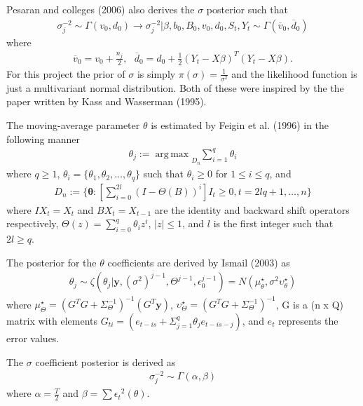 \documentclass[submit]{smj}
\DeclareMathOperator*{\argmax}{arg\,max}
\begin{document}
Pesaran and colleges (2006) also derives the $\sigma$ posterior such that 
\begin{align*}
\sigma_j^{-2} \sim  \Gamma(v_0, d_0) \longrightarrow \sigma^{-2}_j | \beta, b_0, B_0, v_0, d_0 , S_{t}, Y_{t} \sim \Gamma ( \overline{v}_0,  \overline{d}_0)
\end{align*}
where 
\begin{align*}
\overline{v}_0 = v_0 + \frac{n_j}{2} , \ \ \  \overline{d}_0 = d_0 + \frac{1}{2}(Y_t-X\beta)^T(Y_t- X \beta).
\end{align*}
For this project the prior of $\sigma$ is simply $\pi(\sigma) = \frac{1}{\sigma^2}$ and the likelihood function is just a multivariant normal distribution. Both of these were inspired by the the paper written by Kass and Wasserman (1995). 

The moving-average parameter $\theta$ is estimated by Feigin et al. (1996) in the following manner
\begin{align*}
    \theta_j := \argmax\underset{D_n}{}\sum_{i=1}^{q} \theta_i
\end{align*}
where $q \geq 1$, $\theta_i = \{\theta_1,\theta_2,\dots,\theta_q\}$ such that $\theta_i \geq 0 $ for $1 \leq i \leq q$, and 
\begin{align*}
    D_n := \{ \mathbf{\theta}:[\sum_{i=0}^{2l}(I-\Theta(B))^i] I_t \geq 0, t = 2lq + 1,\dots,n\}
\end{align*}
where $IX_t = X_t$ and $BX_t = X_{t-1}$ are the identity and backward shift operators respectively, $\Theta(z) = \sum_{i=0}^{q}\theta_iz^i$, $|z| \leq 1$, and $l$ is the first integer such that $2l \geq q$. 

The posterior for the $\theta$ coefficients are derived by Ismail (2003) as
\begin{align*}
    \theta_j \sim \zeta(\theta_j|\textbf{y},(\sigma^2)^{j-1},\Theta^{j-1},\epsilon_0^{j-1}) = N(\mu_\theta^\star,\sigma^2\upsilon_\theta^\star)
\end{align*}
where
    $\mu_{\Theta}^\star = (G^TG + \Sigma_{\Theta}^{-1})^{-1}(G^T\textbf{y})$, $\upsilon_\Theta^\star = (G^TG + \Sigma_{\Theta}^{-1})^{-1}$, G is a (n x Q) matrix with elements $G_{ti} = (e_{t-is} + \Sigma_{j=1}^q \theta_je_{t-is-j})$, and $e_t$ represents the error values.

The $\sigma$ coefficient posterior is derived as
\begin{align*}
    \sigma_j^{-2} \sim \Gamma(\alpha,\beta)
\end{align*}
    where $\alpha = \frac{T}{2}$ and $\beta = \sum {\epsilon_t}^2(\theta)$.
\end{document}
